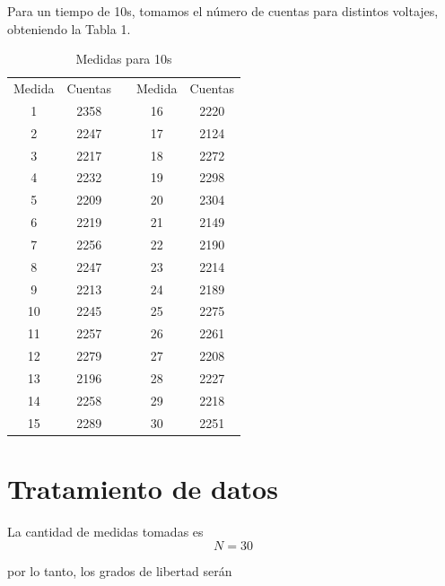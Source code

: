 \documentclass[a4paper,12pt,spanish]{article}
\begin{document}
	Para un tiempo de 10s, tomamos el número de cuentas para distintos voltajes, obteniendo la Tabla 1.
	\begin{table}[H]
		\centering
		\begin{tabular}{|c|c|c|c|c|}
			\cline{1-2} \cline{4-5}
			Medida & Cuentas &  & Medida & Cuentas \\ \cline{1-2} \cline{4-5} 
			1      & 2358    &  & 16     & 2220    \\ \cline{1-2} \cline{4-5} 
			2      & 2247    &  & 17     & 2124    \\ \cline{1-2} \cline{4-5} 
			3      & 2217    &  & 18     & 2272    \\ \cline{1-2} \cline{4-5} 
			4      & 2232    &  & 19     & 2298    \\ \cline{1-2} \cline{4-5} 
			5      & 2209    &  & 20     & 2304    \\ \cline{1-2} \cline{4-5} 
			6      & 2219    &  & 21     & 2149    \\ \cline{1-2} \cline{4-5} 
			7      & 2256    &  & 22     & 2190    \\ \cline{1-2} \cline{4-5} 
			8      & 2247    &  & 23     & 2214    \\ \cline{1-2} \cline{4-5} 
			9      & 2213    &  & 24     & 2189    \\ \cline{1-2} \cline{4-5} 
			10     & 2245    &  & 25     & 2275    \\ \cline{1-2} \cline{4-5} 
			11     & 2257    &  & 26     & 2261    \\ \cline{1-2} \cline{4-5} 
			12     & 2279    &  & 27     & 2208    \\ \cline{1-2} \cline{4-5} 
			13     & 2196    &  & 28     & 2227    \\ \cline{1-2} \cline{4-5} 
			14     & 2258    &  & 29     & 2218    \\ \cline{1-2} \cline{4-5} 
			15     & 2289    &  & 30     & 2251    \\ \cline{1-2} \cline{4-5} 
		\end{tabular}
	\caption{Medidas para 10s}
	\end{table}
	
	\section{Tratamiento de datos}
	
	La cantidad de medidas tomadas es 
	\[N = 30				\]
	
	por lo tanto, los grados de libertad serán
	
\end{document}

